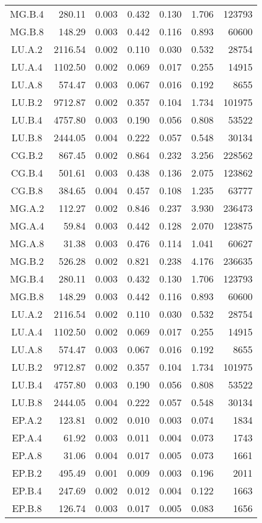 \begin{longtable}[c]{c*{6}{r}}
	MG.B.4 & 280.11 & 0.003 & 0.432 & 0.130 & 1.706 & 123793 \\
	MG.B.8 & 148.29 & 0.003 & 0.442 & 0.116 & 0.893 & 60600 \\
	LU.A.2 & 2116.54 & 0.002 & 0.110 & 0.030 & 0.532 & 28754 \\
	LU.A.4 & 1102.50 & 0.002 & 0.069 & 0.017 & 0.255 & 14915 \\
	LU.A.8 & 574.47 & 0.003 & 0.067 & 0.016 & 0.192 & 8655 \\
	LU.B.2 & 9712.87 & 0.002 & 0.357 & 0.104 & 1.734 & 101975 \\
	LU.B.4 & 4757.80 & 0.003 & 0.190 & 0.056 & 0.808 & 53522 \\
	LU.B.8 & 2444.05 & 0.004 & 0.222 & 0.057 & 0.548 & 30134 \\
	CG.B.2 & 867.45 & 0.002 & 0.864 & 0.232 & 3.256 & 228562 \\
	CG.B.4 & 501.61 & 0.003 & 0.438 & 0.136 & 2.075 & 123862 \\
	CG.B.8 & 384.65 & 0.004 & 0.457 & 0.108 & 1.235 & 63777 \\
	MG.A.2 & 112.27 & 0.002 & 0.846 & 0.237 & 3.930 & 236473 \\
	MG.A.4 & 59.84 & 0.003 & 0.442 & 0.128 & 2.070 & 123875 \\
	MG.A.8 & 31.38 & 0.003 & 0.476 & 0.114 & 1.041 & 60627 \\
	MG.B.2 & 526.28 & 0.002 & 0.821 & 0.238 & 4.176 & 236635 \\
	MG.B.4 & 280.11 & 0.003 & 0.432 & 0.130 & 1.706 & 123793 \\
	MG.B.8 & 148.29 & 0.003 & 0.442 & 0.116 & 0.893 & 60600 \\
	LU.A.2 & 2116.54 & 0.002 & 0.110 & 0.030 & 0.532 & 28754 \\
	LU.A.4 & 1102.50 & 0.002 & 0.069 & 0.017 & 0.255 & 14915 \\
	LU.A.8 & 574.47 & 0.003 & 0.067 & 0.016 & 0.192 & 8655 \\
	LU.B.2 & 9712.87 & 0.002 & 0.357 & 0.104 & 1.734 & 101975 \\
	LU.B.4 & 4757.80 & 0.003 & 0.190 & 0.056 & 0.808 & 53522 \\
	LU.B.8 & 2444.05 & 0.004 & 0.222 & 0.057 & 0.548 & 30134 \\
	EP.A.2 & 123.81 & 0.002 & 0.010 & 0.003 & 0.074 & 1834 \\
	EP.A.4 & 61.92 & 0.003 & 0.011 & 0.004 & 0.073 & 1743 \\
	EP.A.8 & 31.06 & 0.004 & 0.017 & 0.005 & 0.073 & 1661 \\
	EP.B.2 & 495.49 & 0.001 & 0.009 & 0.003 & 0.196 & 2011 \\
	EP.B.4 & 247.69 & 0.002 & 0.012 & 0.004 & 0.122 & 1663 \\
	EP.B.8 & 126.74 & 0.003 & 0.017 & 0.005 & 0.083 & 1656 \\
	\bottomrule
\end{longtable}

